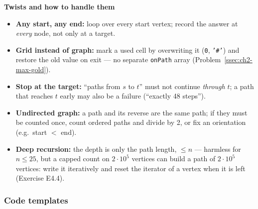 \textbf{Twists and how to handle them}
\begin{itemize}[leftmargin=*]
    \item \textbf{Any start, any end:} loop over every start vertex; record the answer at \emph{every} node, not only at a target.
    \item \textbf{Grid instead of graph:} mark a used cell by overwriting it (\texttt{0}, \texttt{'\#'}) and restore the old value on exit --- no separate \texttt{onPath} array (Problem~\ref{ssec:ch2-max-gold}).
    \item \textbf{Stop at the target:} ``paths from $s$ to $t$'' must not continue \emph{through} $t$; a path that reaches $t$ early may also be a failure (``exactly 48 steps'').
    \item \textbf{Undirected graph:} a path and its reverse are the same path; if they must be counted once, count ordered paths and divide by 2, or fix an orientation (e.g.\ start $<$ end).
    \item \textbf{Deep recursion:} the depth is only the path length, $\le n$ --- harmless for $n \le 25$, but a capped count on $2\cdot10^5$ vertices can build a path of $2\cdot10^5$ vertices: write it iteratively and reset the iterator of a vertex when it is left (Exercise E4.4).
\end{itemize}

\subsubsection*{Code templates}

